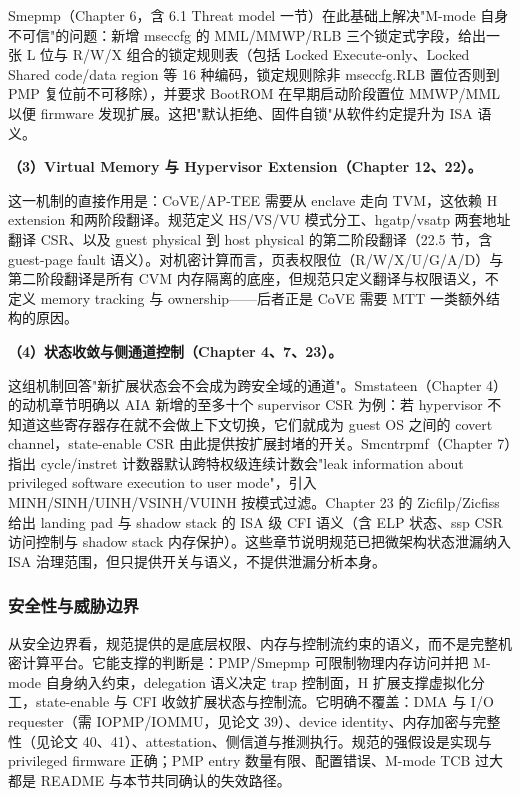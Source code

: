 \documentclass[11pt]{ctexart}
\begin{document}
Smepmp（Chapter 6，含 6.1 Threat model 一节）在此基础上解决"M-mode 自身不可信"的问题：新增 mseccfg 的 MML/MMWP/RLB 三个锁定式字段，给出一张 L 位与 R/W/X 组合的锁定规则表（包括 Locked Execute-only、Locked Shared code/data region 等 16 种编码，锁定规则除非 mseccfg.RLB 置位否则到 PMP 复位前不可移除），并要求 BootROM 在早期启动阶段置位 MMWP/MML 以便 firmware 发现扩展。这把"默认拒绝、固件自锁"从软件约定提升为 ISA 语义。\par
\noindent\textbf{（3）Virtual Memory 与 Hypervisor Extension（Chapter 12、22）。}\par
这一机制的直接作用是：CoVE/AP-TEE 需要从 enclave 走向 TVM，这依赖 H extension 和两阶段翻译。规范定义 HS/VS/VU 模式分工、hgatp/vsatp 两套地址翻译 CSR、以及 guest physical 到 host physical 的第二阶段翻译（22.5 节，含 guest-page fault 语义）。对机密计算而言，页表权限位（R/W/X/U/G/A/D）与第二阶段翻译是所有 CVM 内存隔离的底座，但规范只定义翻译与权限语义，不定义 memory tracking 与 ownership——后者正是 CoVE 需要 MTT 一类额外结构的原因。\par
\noindent\textbf{（4）状态收敛与侧通道控制（Chapter 4、7、23）。}\par
这组机制回答"新扩展状态会不会成为跨安全域的通道"。Smstateen（Chapter 4）的动机章节明确以 AIA 新增的至多十个 supervisor CSR 为例：若 hypervisor 不知道这些寄存器存在就不会做上下文切换，它们就成为 guest OS 之间的 covert channel，state-enable CSR 由此提供按扩展封堵的开关。Smcntrpmf（Chapter 7）指出 cycle/instret 计数器默认跨特权级连续计数会"leak information about privileged software execution to user mode"，引入 MINH/SINH/UINH/VSINH/VUINH 按模式过滤。Chapter 23 的 Zicfilp/Zicfiss 给出 landing pad 与 shadow stack 的 ISA 级 CFI 语义（含 ELP 状态、ssp CSR 访问控制与 shadow stack 内存保护）。这些章节说明规范已把微架构状态泄漏纳入 ISA 治理范围，但只提供开关与语义，不提供泄漏分析本身。\par
\subsubsection{安全性与威胁边界}
从安全边界看，规范提供的是底层权限、内存与控制流约束的语义，而不是完整机密计算平台。它能支撑的判断是：PMP/Smepmp 可限制物理内存访问并把 M-mode 自身纳入约束，delegation 语义决定 trap 控制面，H 扩展支撑虚拟化分工，state-enable 与 CFI 收敛扩展状态与控制流。它明确不覆盖：DMA 与 I/O requester（需 IOPMP/IOMMU，见论文 39）、device identity、内存加密与完整性（见论文 40、41）、attestation、侧信道与推测执行。规范的强假设是实现与 privileged firmware 正确；PMP entry 数量有限、配置错误、M-mode TCB 过大都是 README 与本节共同确认的失效路径。\par
\end{document}
